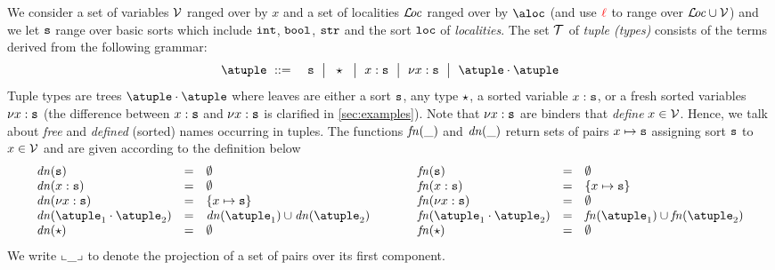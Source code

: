%

We consider a set of variables $\varset$  ranged over by $x$
and a set of localities $\locset$ ranged over by $\aloc$ (and
use $\alocvar$ to range over $\locset\cup\varset$) and we let $\asort$
range over basic sorts which include $\asort[int]$, $\asort[bool]$,
$\asort[str]$ and the sort $\asort[loc]$ of \emph{localities}.
%
The set $\tupleset$ of \emph{tuple (types)} consists of the terms
derived from the following grammar:
\begin{eqnarray*}
  \atuple & \bnfdef & \asort \bnfmid
                        \wildcard\bnfmid
                      x : \asort \bnfmid
                      \nu x : \asort  \bnfmid
                      \atuple \cdot \atuple 
\end{eqnarray*}
Tuple types are trees  $\atuple \cdot \atuple$  where leaves are
 either a sort $\asort$, any type $\wildcard$,  a sorted variable $x : \asort$,
or a fresh sorted variables $\nu x : \asort$ 
(the difference between $x : \asort$ and $\nu x : \asort$ is clarified in \cref{sec:examples}).
Note that $\nu x : \asort$ are binders that \emph{define}
$x \in \varset$. 
%
Hence, we talk about \emph{free} and \emph{defined} (sorted) names occurring in
tuples.
%
%
The functions $\fn{\_}$ and $\dn{\_}$ return sets of pairs
$x \mapsto \asort$ assigning sort $\asort$ to $x \in \varset$
and are given according to the definition below
\[
\begin{array}{l@{\hspace{1cm}}l}
\begin{array}{lcl}
  \dn\asort & = & \emptyset
  \\
  \dn{x : \asort} & = & \emptyset
  \\
  \dn{\nu x : \asort} & = & \{x \mapsto \asort \}
  \\
  \dn{\atuple_1 \cdot \atuple_2} & = & \dn{\atuple_1} \cup \dn{\atuple_2}
  \\
  \dn{\wildcard} & = & \emptyset
\end{array}
&
\begin{array}{lcl}
  \fn\asort & = & \emptyset
  \\
  \fn{x : \asort} & = &  \{x \mapsto \asort\}
  \\
  \fn{\nu x : \asort} & = & \emptyset
  \\
  \fn{\atuple_1 \cdot \atuple_2} & = & \fn{\atuple_1} \cup \fn{\atuple_2}
  \\
  \fn{\wildcard} & = & \emptyset
\end{array}
\end{array}
\]
We write $\supp{\_}$ to denote the projection of a set of pairs over its first component. 

